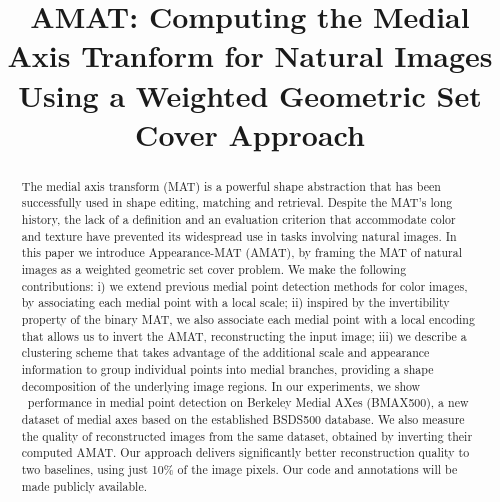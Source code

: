 \documentclass[10pt,twocolumn,letterpaper]{article}
\begin{document}
\title{AMAT: Computing the Medial Axis Tranform for Natural Images Using a Weighted Geometric Set Cover Approach}
\maketitle


\begin{abstract}
The medial axis transform (MAT) is a powerful shape abstraction that has been successfully
used in shape editing, matching and retrieval. 
Despite the MAT's long history, the lack of a definition and an evaluation criterion 
that accommodate color and texture have prevented its widespread use in tasks involving natural images.
In this paper we introduce Appearance-MAT (AMAT), by framing the MAT 
of natural images as a weighted geometric set cover problem.
We make the following contributions: 
i) we extend previous medial point detection methods for color images,
by associating each medial point with a local scale; 
ii) inspired by the invertibility property of the binary MAT, we also associate each medial point with a local encoding
that allows us to invert the AMAT, reconstructing the input image; 
iii) we describe a clustering scheme that takes advantage of the additional scale and appearance information 
to group individual points into medial branches, providing a shape decomposition of the underlying image regions.
In our experiments, we show \sota\ performance in medial point detection on
Berkeley Medial AXes (BMAX500), a new dataset of medial axes based on the established BSDS500 database.
We also measure the quality of reconstructed images from the same dataset,
obtained by inverting their computed AMAT.
Our approach delivers significantly better reconstruction quality \wrt to two baselines,
using just 10\% of the image pixels. 
Our code and annotations will be made publicly available.
\end{abstract}


\end{document}
